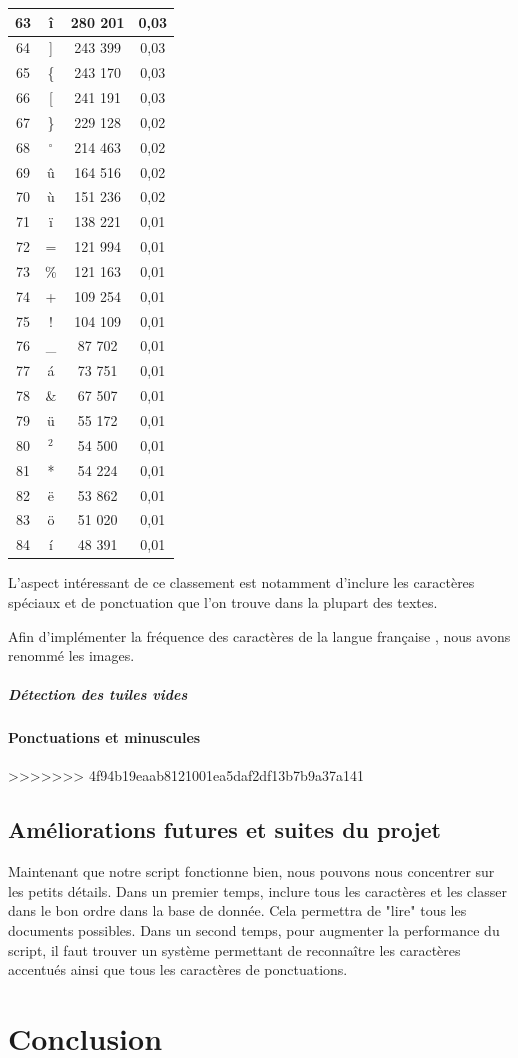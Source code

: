 \documentclass[a4paper,12pt,titlepage]{report}
\begin{document}
\begin{table}
\begin{tabular}{|c|c|c|c|}
\hline
63 & î & 	280 201 & 0,03 \\
\hline
64 & ] &	243 399 & 0,03 \\
\hline
65 &\{ &	243 170 & 0,03 \\
\hline
66 & [ &	241 191 & 0,03 \\
\hline
67 &\} &	229 128 & 0,02 \\
\hline
68 &$^\circ$&214 463& 0,02 \\
\hline
69 & û &    164 516 & 0,02 \\
\hline
70 & ù &	151 236 & 0,02 \\
\hline
71 & ï &	138 221 & 0,01 \\
\hline
72 & = &	121 994 & 0,01 \\
\hline
73 &\% &	121 163 & 0,01 \\
\hline
74 & + &	109 254 & 0,01 \\
\hline
75 & ! &	104 109 & 0,01 \\
\hline
76 &\_ &	 87 702 & 0,01 \\
\hline
77 & á &	 73 751 & 0,01 \\
\hline
78 &\& &	 67 507 & 0,01 \\
\hline
79 & ü & 	 55 172 & 0,01 \\
\hline
80 &$^2$& 	 54 500 & 0,01 \\
\hline
81 & * &	 54 224 & 0,01 \\
\hline
82 & ë & 	 53 862 & 0,01 \\
\hline
83 & ö & 	 51 020 & 0,01 \\
\hline
84 & í &	 48 391 & 0,01 \\ 
\hline
\end{tabular}
\label{freq_carac}
\end{table}	

L'aspect intéressant de ce classement est notamment d'inclure les caractères spéciaux et de ponctuation que l'on trouve dans la plupart des textes. 

Afin d'implémenter la fréquence des caractères de la langue française , nous avons renommé les images.

\subparagraph{Détection des tuiles vides}
	
	\paragraph{Ponctuations et minuscules}
>>>>>>> 4f94b19eaab8121001ea5daf2df13b7b9a37a141
	\subsection{Améliorations futures et suites du projet}	
	Maintenant que notre script fonctionne bien, nous pouvons nous concentrer sur les petits détails. Dans un premier temps, inclure tous les caractères et les classer dans le bon ordre dans la base de donnée. Cela permettra de "lire" tous les documents possibles. Dans un second temps, pour augmenter la performance du script, il faut trouver un système permettant de reconnaître les caractères accentués ainsi que tous les caractères de ponctuations.
	\section{Conclusion}
	
\end{document}
